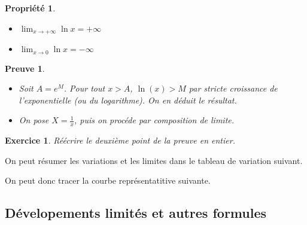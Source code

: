 \documentclass[11pt,a4paper,french]{article}
\theoremstyle{break}
\newtheorem{propriete}{Propriété}
\theoremstyle{plain}
\newtheorem{exerciceT}{Exercice}
\theoremstyle{nonumberplain}
\newtheorem{preuve}{Preuve}
\theoremstyle{nonumberbreak}
\newenvironment{exercice}{\begin{framed}\begin{exerciceT}}{\end{exerciceT}\end{framed}}
\begin{document}
\begin{propriete}
  \begin{multicols}{2}
    \begin{itemize}
      \item $\lim_{x\to+\infty}\ln x = +\infty$
      \item $\lim_{x\to 0}\ln x = -\infty$
    \end{itemize}
  \end{multicols}
\end{propriete}
\begin{preuve}
  \begin{itemize}
    \item Soit $A = e^M$. Pour tout $x>A$, $\ln(x) > M$ par stricte
      croissance de l'exponentielle (ou du logarithme). On en déduit le
      résultat.
    \item On pose $X = \frac1x$, puis on procéde par composition de
      limite.
  \end{itemize}
\end{preuve}

\begin{exercice}
  Réécrire le deuxième point de la preuve en entier.
\end{exercice}

On peut résumer les variations et les limites dans le tableau de
variation suivant.

\begin{center}
\end{center}

On peut donc tracer la courbe représentatitive suivante.

\begin{center}
\end{center}

\subsection{Dévelopements limités et autres formules}
\end{document}
